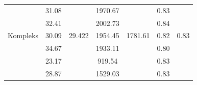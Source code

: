 \documentclass[conference]{IEEEtran}
\begin{document}
\begin{table}[]
\begin{tabular}{|l|cc|cc|cc|}
                                                      & \multicolumn{1}{c|}{\cellcolor[HTML]{FFFFFF}31.08} & \cellcolor[HTML]{FFFFFF}                         & \multicolumn{1}{c|}{\cellcolor[HTML]{FFFFFF}1970.67} & \cellcolor[HTML]{FFFFFF}                           & \multicolumn{1}{c|}{\cellcolor[HTML]{FFFFFF}0.83} & \cellcolor[HTML]{FFFFFF}                        \\ \cline{2-2} \cline{4-4} \cline{6-6}
                                                      & \multicolumn{1}{c|}{\cellcolor[HTML]{FFFFFF}32.41} & \cellcolor[HTML]{FFFFFF}                         & \multicolumn{1}{c|}{\cellcolor[HTML]{FFFFFF}2002.73} & \cellcolor[HTML]{FFFFFF}                           & \multicolumn{1}{c|}{\cellcolor[HTML]{FFFFFF}0.84} & \cellcolor[HTML]{FFFFFF}                        \\ \cline{2-2} \cline{4-4} \cline{6-6}
  \multirow{-5}{*}{Kompleks}             & \multicolumn{1}{c|}{\cellcolor[HTML]{FFFFFF}30.09} & \multirow{-5}{*}{\cellcolor[HTML]{FFFFFF}29.422} & \multicolumn{1}{c|}{\cellcolor[HTML]{FFFFFF}1954.45} & \multirow{-5}{*}{\cellcolor[HTML]{FFFFFF}1781.61} & \multicolumn{1}{c|}{\cellcolor[HTML]{FFFFFF}0.82} & \multirow{-5}{*}{\cellcolor[HTML]{FFFFFF}0.83} \\ \hline
                                                      & \multicolumn{1}{c|}{\cellcolor[HTML]{FFFFFF}34.67} & \cellcolor[HTML]{FFFFFF}                         & \multicolumn{1}{c|}{\cellcolor[HTML]{FFFFFF}1933.11} & \cellcolor[HTML]{FFFFFF}                           & \multicolumn{1}{c|}{\cellcolor[HTML]{FFFFFF}0.80} & \cellcolor[HTML]{FFFFFF}                        \\ \cline{2-2} \cline{4-4} \cline{6-6}
                                                      & \multicolumn{1}{c|}{\cellcolor[HTML]{FFFFFF}23.17} & \cellcolor[HTML]{FFFFFF}                         & \multicolumn{1}{c|}{\cellcolor[HTML]{FFFFFF}919.54}  & \cellcolor[HTML]{FFFFFF}                           & \multicolumn{1}{c|}{\cellcolor[HTML]{FFFFFF}0.83} & \cellcolor[HTML]{FFFFFF}                        \\ \cline{2-2} \cline{4-4} \cline{6-6}
                                                      & \multicolumn{1}{c|}{\cellcolor[HTML]{FFFFFF}28.87} & \cellcolor[HTML]{FFFFFF}                         & \multicolumn{1}{c|}{\cellcolor[HTML]{FFFFFF}1529.03} & \cellcolor[HTML]{FFFFFF}                           & \multicolumn{1}{c|}{\cellcolor[HTML]{FFFFFF}0.83} & \cellcolor[HTML]{FFFFFF}                        \\ \cline{2-2} \cline{4-4} \cline{6-6}

\end{tabular}
\end{table}
\end{document}
